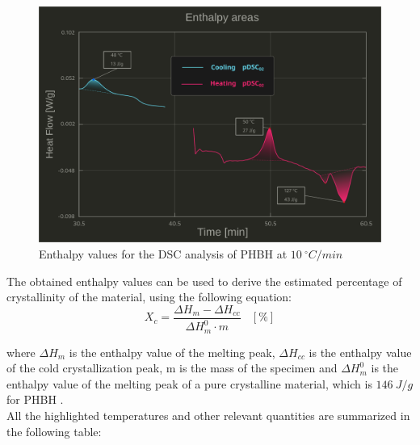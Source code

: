\documentclass{article}
\begin{document}
        \begin{figure}[h!]
            \centering
            \includegraphics[width=\textwidth]{Pictures/Thermal_analysis_plots/DSC_peaks_areas.pdf}
            \caption{Enthalpy values for the DSC analysis of PHBH at $10 \ ^{\circ}C/min$}
            \label{fig:DSC_enthalpy}
        \end{figure}

        The obtained enthalpy values can be used to derive the estimated percentage of crystallinity of the material, using the following equation: \\

        \begin{equation}
            X_c = \frac{\Delta H_{m} - \Delta H_{cc}}{\Delta H_{m}^{0} \cdot m} \ \ \ \ [\%]
            \label{eq:crystallinity}
        \end{equation}

        where $\Delta H_{m}$ is the enthalpy value of the melting peak, $\Delta H_{cc}$ is the enthalpy value of the cold crystallization peak, 
        m is the mass of the specimen and $\Delta H_{m}^{0}$ is the enthalpy value of the melting peak of a pure crystalline material, 
        which is $146 \ J/g$ for PHBH \autocites{PHBH_Crystallinity}. \\

        All the highlighted temperatures and other relevant quantities are summarized in the following table: 
\end{document}
